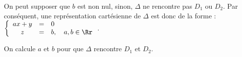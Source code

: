 {\begin{question}
\begin{explanations}
 On peut supposer que $b$ est non nul, sinon, $\Delta$ ne rencontre pas $D_1$ ou $D_2$. Par conséquent, une représentation cartésienne de $\Delta$ est donc  de la forme :
$ \left\{\begin{array}{ccl}ax+y&=&0\\z&=&b, \quad a,b \in \Rr \end{array}\right.$.

 On calcule $a$ et $b$ pour que $\Delta$ rencontre $D_1$ et $D_2$.
\end{explanations}
\end{question}
}
